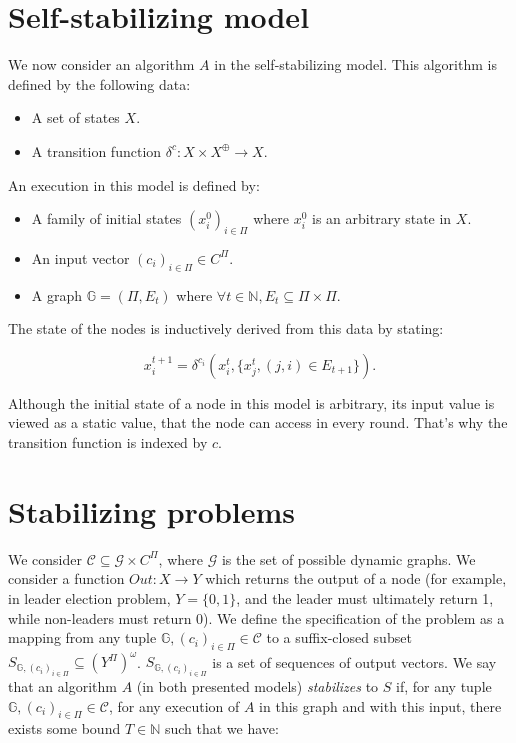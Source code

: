 \documentclass[11pt,letterpaper]{article}
\begin{document}
\section{Self-stabilizing model}

We now consider an algorithm $A$ in the self-stabilizing model.
This algorithm is defined by the following data:

\begin{itemize}
	\item A set of states $X$.
	\item A transition function $\delta^c : X \times X^\oplus \rightarrow X$.
\end{itemize}

\noindent An execution in this model is defined by:
\begin{itemize}
	\item A family of initial states $(x_i^0)_{i \in \Pi}$ where $x_i^0$ is an arbitrary state in $X$.
	\item An input vector $(c_i)_{i \in \Pi} \in C^\Pi$.
	\item A graph $\mathds{G} = (\Pi, E_t)$ where $\forall t \in \mathds{N}, E_t \subseteq \Pi \times \Pi$.
\end{itemize}

The state of the nodes is inductively derived from this data by stating:

$$x_i^{t+1} = \delta^{c_i}(x_i^t, \{x_j^t, (j,i) \in E_{t+1}\}).$$

Although the initial state of a node in this model is arbitrary, its input value is viewed as a static value,
that the node can access in every round. That's why the transition function is indexed by $c$.

\section{Stabilizing problems}

We consider $\mathcal{C} \subseteq \mathcal{G} \times C^\Pi$, where $\mathcal{G}$ is the set of possible dynamic graphs.
We consider a function $Out : X \rightarrow Y$ which returns the output of a node
(for example, in leader election problem, $Y = \{0,1\}$, and the leader must ultimately return 1, while non-leaders must return 0).
We define the specification of the problem as a mapping from any tuple $\mathds{G}, (c_i)_{i \in \Pi} \in \mathcal{C}$
to a suffix-closed subset $S_{\mathds{G}, (c_i)_{i \in \Pi}} \subseteq (Y^\Pi)^\omega$.
$S_{\mathds{G}, (c_i)_{i \in \Pi}}$ is a set of sequences of output vectors.
We say that an algorithm $A$ (in both presented models) \textit{stabilizes} to $S$ if, for any tuple $\mathds{G}, (c_i)_{i \in \Pi} \in \mathcal{C}$,
for any execution of $A$ in this graph and with this input, there exists some bound $T \in \mathds{N}$ such that we have:
\end{document}
